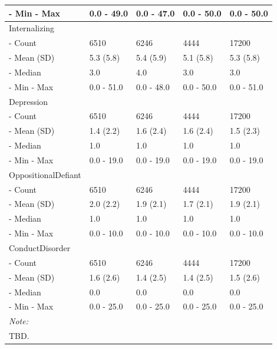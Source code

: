 \documentclass{article}
\begin{document}
\begin{table}
\begin{tabular}[t]{>{}l||>{}l||>{}l||>{}l||l}
\hline
-  Min -
                                                 Max & 0.0 - 49.0 & 0.0 - 47.0 & 0.0 - 50.0 & 0.0 - 50.0\\
\hline
Internalizing &  &  &  & \\
\hline
-  Count & 6510 & 6246 & 4444 & \vphantom{3} 17200\\
\hline
-  Mean (SD) & 5.3 (5.8) & 5.4 (5.9) & 5.1 (5.8) & 5.3 (5.8)\\
\hline
-  Median & 3.0 & 4.0 & 3.0 & 3.0\\
\hline
-  Min -
                                                 Max & 0.0 - 51.0 & 0.0 - 48.0 & 0.0 - 50.0 & 0.0 - 51.0\\
\hline
Depression &  &  &  & \\
\hline
-  Count & 6510 & 6246 & 4444 & \vphantom{2} 17200\\
\hline
-  Mean (SD) & 1.4 (2.2) & 1.6 (2.4) & 1.6 (2.4) & 1.5 (2.3)\\
\hline
-  Median & 1.0 & 1.0 & 1.0 & \vphantom{1} 1.0\\
\hline
-  Min -
                                                 Max & 0.0 - 19.0 & 0.0 - 19.0 & 0.0 - 19.0 & 0.0 - 19.0\\
\hline
OppositionalDefiant &  &  &  & \\
\hline
-  Count & 6510 & 6246 & 4444 & \vphantom{1} 17200\\
\hline
-  Mean (SD) & 2.0 (2.2) & 1.9 (2.1) & 1.7 (2.1) & 1.9 (2.1)\\
\hline
-  Median & 1.0 & 1.0 & 1.0 & 1.0\\
\hline
-  Min -
                                                 Max & 0.0 - 10.0 & 0.0 - 10.0 & 0.0 - 10.0 & 0.0 - 10.0\\
\hline
ConductDisorder &  &  &  & \\
\hline
-  Count & 6510 & 6246 & 4444 & 17200\\
\hline
-  Mean (SD) & 1.6 (2.6) & 1.4 (2.5) & 1.4 (2.5) & 1.5 (2.6)\\
\hline
-  Median & 0.0 & 0.0 & 0.0 & 0.0\\
\hline
-  Min -
                                                 Max & 0.0 - 25.0 & 0.0 - 25.0 & 0.0 - 25.0 & 0.0 - 25.0\\
\hline
\multicolumn{5}{l}{\rule{0pt}{1em}\textit{Note: }}\\
\multicolumn{5}{l}{\rule{0pt}{1em}TBD. }\\
\end{tabular}
\end{table}
\end{document}
